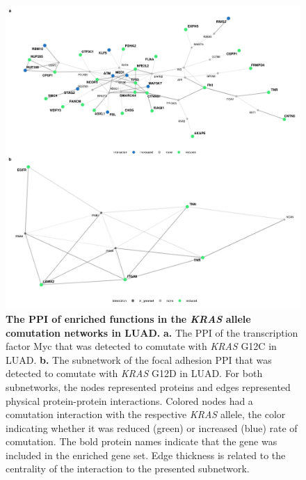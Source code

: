 \documentclass[english, 12pt, letterpaper]{article}
\newcommand{\KRAS}{\emph{KRAS}}
\begin{document}
\begin{figure}
\centering
\includegraphics[width=\textwidth]{figures/SuppFigure_11.jpeg}
\caption{
    \textbf{The PPI of enriched functions in the \KRAS{} allele comutation networks in LUAD.}
    \textbf{a.} The PPI of the transcription factor Myc that was detected to comutate with \KRAS{} G12C in LUAD.
    \textbf{b.} The subnetwork of the focal adhesion PPI that was detected to comutate with \KRAS{} G12D in LUAD.
    For both subnetworks, the nodes represented proteins and edges represented physical protein-protein interactions. Colored nodes had a comutation interaction with the respective \KRAS{} allele, the color indicating whether it was reduced (green) or increased (blue) rate of comutation.
    The bold protein names indicate that the gene was included in the enriched gene set.
    Edge thickness is related to the centrality of the interaction to the presented subnetwork.
}
\label{sfig:luad-enriched-comutation-ppi-examples}
\end{figure}
\end{document}
